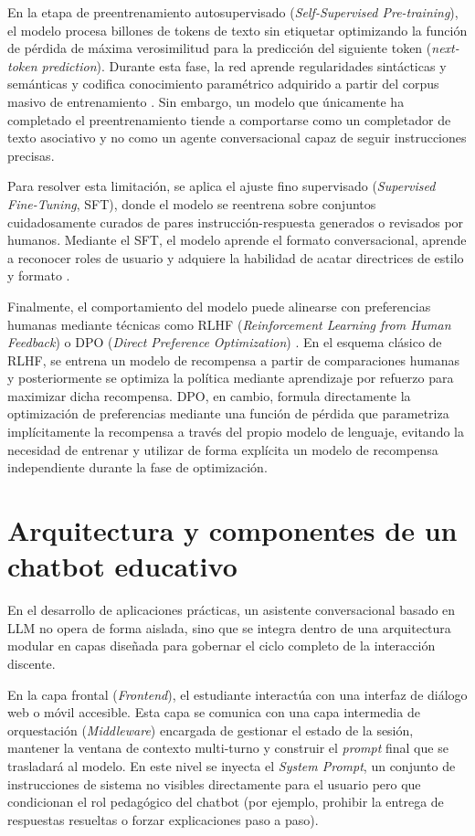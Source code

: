 En la etapa de preentrenamiento autosupervisado (\textit{Self-Supervised Pre-training}), el modelo procesa billones de tokens de texto sin etiquetar optimizando la función de pérdida de máxima verosimilitud para la predicción del siguiente token (\textit{next-token prediction}). Durante esta fase, la red aprende regularidades sintácticas y semánticas y codifica conocimiento paramétrico adquirido a partir del corpus masivo de entrenamiento \cite{radford2019language, dubey2024llama}. Sin embargo, un modelo que únicamente ha completado el preentrenamiento tiende a comportarse como un completador de texto asociativo y no como un agente conversacional capaz de seguir instrucciones precisas.

Para resolver esta limitación, se aplica el ajuste fino supervisado (\textit{Supervised Fine-Tuning}, SFT), donde el modelo se reentrena sobre conjuntos cuidadosamente curados de pares instrucción-respuesta generados o revisados por humanos. Mediante el SFT, el modelo aprende el formato conversacional, aprende a reconocer roles de usuario y adquiere la habilidad de acatar directrices de estilo y formato \cite{dubey2024llama}.

Finalmente, el comportamiento del modelo puede alinearse con preferencias humanas mediante técnicas como RLHF (\textit{Reinforcement Learning from Human Feedback}) o DPO (\textit{Direct Preference Optimization}) \cite{rafailov2024direct}. En el esquema clásico de RLHF, se entrena un modelo de recompensa a partir de comparaciones humanas y posteriormente se optimiza la política mediante aprendizaje por refuerzo para maximizar dicha recompensa. DPO, en cambio, formula directamente la optimización de preferencias mediante una función de pérdida que parametriza implícitamente la recompensa a través del propio modelo de lenguaje, evitando la necesidad de entrenar y utilizar de forma explícita un modelo de recompensa independiente durante la fase de optimización.

\section{Arquitectura y componentes de un chatbot educativo}
\label{sec:arquitectura_chatbots}
En el desarrollo de aplicaciones prácticas, un asistente conversacional basado en LLM no opera de forma aislada, sino que se integra dentro de una arquitectura modular en capas diseñada para gobernar el ciclo completo de la interacción discente.

En la capa frontal (\textit{Frontend}), el estudiante interactúa con una interfaz de diálogo web o móvil accesible. Esta capa se comunica con una capa intermedia de orquestación (\textit{Middleware}) encargada de gestionar el estado de la sesión, mantener la ventana de contexto multi-turno y construir el \textit{prompt} final que se trasladará al modelo. En este nivel se inyecta el \textit{System Prompt}, un conjunto de instrucciones de sistema no visibles directamente para el usuario pero que condicionan el rol pedagógico del chatbot (por ejemplo, prohibir la entrega de respuestas resueltas o forzar explicaciones paso a paso).

